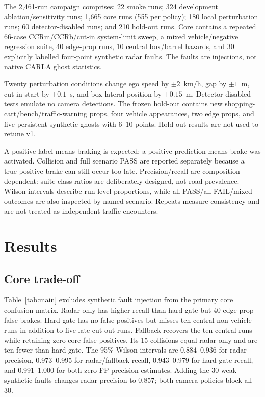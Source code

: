 \documentclass[conference]{IEEEtran}
\begin{document}
The 2,461-run campaign comprises: 22 smoke runs; 324 development
ablation/sensitivity runs; 1,665 core runs (555 per policy); 180 local
perturbation runs; 60 detector-disabled runs; and 210 hold-out runs. Core
contains a repeated 66-case CCRm/CCRb/cut-in system-limit sweep, a mixed
vehicle/negative regression suite, 40 edge-prop runs, 10 central box/barrel
hazards, and 30 explicitly labelled four-point synthetic radar faults. The
faults are injections, not native CARLA ghost statistics.

Twenty perturbation conditions change ego speed by $\pm2$~km/h, gap by
$\pm1$~m, cut-in start by $\pm0.1$~s, and box lateral position by
$\pm0.15$~m. Detector-disabled tests emulate no camera detections. The frozen
hold-out contains new shopping-cart/bench/traffic-warning props, four vehicle
appearances, two edge props, and five persistent synthetic ghosts with 6--10
points. Hold-out results are not used to retune v1.

A positive label means braking is expected; a positive prediction means brake
was activated. Collision and full scenario PASS are reported separately because
a true-positive brake can still occur too late. Precision/recall are
composition-dependent: suite class ratios are deliberately designed, not road
prevalence. Wilson intervals describe run-level proportions, while
all-PASS/all-FAIL/mixed outcomes are also inspected by named scenario. Repeats
measure consistency and are not treated as independent traffic encounters.

\section{Results}
\subsection{Core trade-off}
Table~\ref{tab:main} excludes synthetic fault injection from the primary core
confusion matrix. Radar-only has higher recall than hard gate but 40 edge-prop
false brakes. Hard gate has no false positives but misses ten central
non-vehicle runs in addition to five late cut-out runs. Fallback recovers the ten
central runs while retaining zero core false positives. Its 15 collisions equal
radar-only and are ten fewer than hard gate. The 95\% Wilson intervals are
0.884--0.936 for radar precision, 0.973--0.995 for radar/fallback recall,
0.943--0.979 for hard-gate recall, and 0.991--1.000 for both zero-FP precision
estimates. Adding the 30 weak synthetic faults changes radar precision to 0.857;
both camera policies block all 30.
\end{document}
